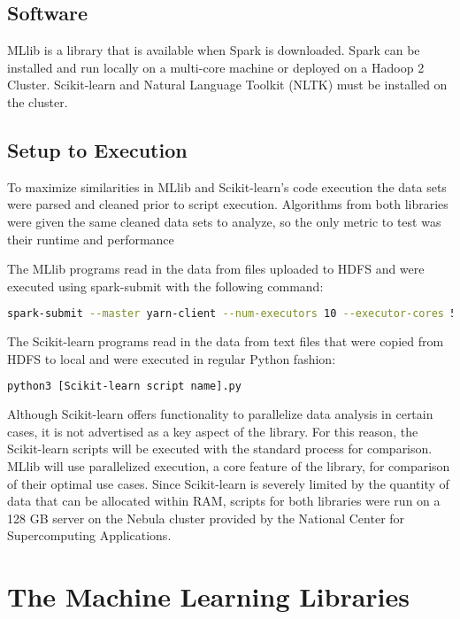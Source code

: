 \documentclass[9pt,twocolumn,twoside]{idsi}
\begin{document}
\subsection{Software}
MLlib is a library that is available when Spark is downloaded. Spark can be installed and run locally on a multi-core machine or deployed on a Hadoop 2 Cluster.\cite{spark_standalone} Scikit-learn and Natural Language Toolkit (NLTK) must be installed on the cluster. 

\subsection{Setup to Execution}
To maximize similarities in MLlib and Scikit-learn's code execution the data sets were parsed and cleaned prior to script execution. Algorithms from both libraries were given the same cleaned data sets to analyze, so the only metric to test was their runtime and performance

The MLlib programs read in the data from files uploaded to HDFS and were executed using spark-submit with the following command: 

\begin{lstlisting}[language=Bash, breaklines=true]
spark-submit --master yarn-client --num-executors 10 --executor-cores 5 --executor-memory 4G --driver-memory 4G [MLlib script name].py
\end{lstlisting}
The Scikit-learn programs read in the data from text files that were copied from HDFS to local and were executed in regular Python fashion:
\begin{lstlisting}[language=Bash, breaklines=true]
python3 [Scikit-learn script name].py
\end{lstlisting} 

Although Scikit-learn offers functionality to parallelize data analysis in certain cases, it is not advertised as a key aspect of the library. For this reason, the Scikit-learn scripts will be executed with the standard process for comparison. MLlib will use parallelized execution, a core feature of the library, for comparison of their optimal use cases. Since Scikit-learn is severely limited by the quantity of data that can be allocated within RAM, scripts for both libraries were run on a 128 GB server on the Nebula cluster provided by the National Center for Supercomputing Applications. 

\section{The Machine Learning Libraries}
\end{document}
